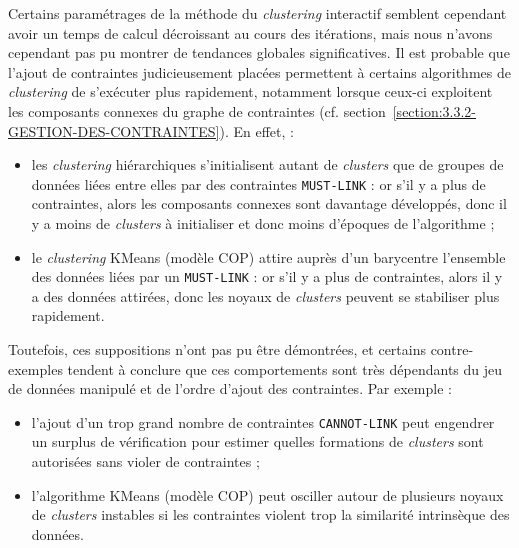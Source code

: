 			\begin{leftBarAuthorOpinion}
				Certains paramétrages de la méthode du \textit{clustering} interactif semblent cependant avoir un temps de calcul décroissant au cours des itérations, mais nous n'avons cependant pas pu montrer de tendances globales significatives.
				Il est probable que l'ajout de contraintes judicieusement placées permettent à certains algorithmes de \textit{clustering} de s'exécuter plus rapidement, notamment lorsque ceux-ci exploitent les composants connexes du graphe de contraintes (cf. section~\ref{section:3.3.2-GESTION-DES-CONTRAINTES}). En effet, :
				\begin{itemize}
					\item les \textit{clustering} hiérarchiques s'initialisent autant de \textit{clusters} que de groupes de données liées entre elles par des contraintes \texttt{MUST-LINK} : or s'il y a plus de contraintes, alors les composants connexes sont davantage développés, donc il y a moins de \textit{clusters} à initialiser et donc moins d'époques de l'algorithme ;
					\item le \textit{clustering} KMeans (modèle COP) attire auprès d'un barycentre l'ensemble des données liées par un \texttt{MUST-LINK} : or s'il y a plus de contraintes, alors il y a des données attirées, donc les noyaux de \textit{clusters} peuvent se stabiliser plus rapidement.  
				\end{itemize}
				Toutefois, ces suppositions n'ont pas pu être démontrées, et certains contre-exemples tendent à conclure que ces comportements sont très dépendants du jeu de données manipulé et de l'ordre d'ajout des contraintes. Par exemple :
				\begin{itemize}
					\item l'ajout d'un trop grand nombre de contraintes \texttt{CANNOT-LINK} peut engendrer un surplus de vérification pour estimer quelles formations de \textit{clusters} sont autorisées sans violer de contraintes ;
					\item l'algorithme KMeans (modèle COP) peut osciller autour de plusieurs noyaux de \textit{clusters} instables si les contraintes violent trop la similarité intrinsèque des données.
				\end{itemize}
			\end{leftBarAuthorOpinion}
			
